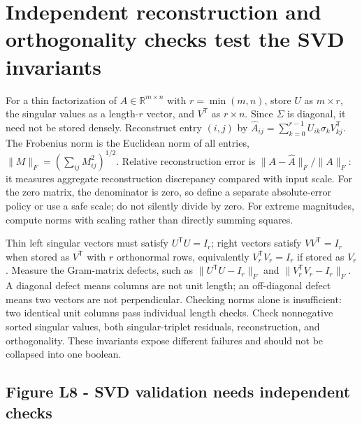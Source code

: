 \section{Independent reconstruction and orthogonality checks test the SVD invariants}\label{02-foundations-ii-ch038-independent-reconstruction-and-orthogonality-checks-test-the-svd-invariants}

\hypertarget{02-foundations-ii-ch038-independent-reconstruction-and-orthogonality-checks-test-the-svd-invariants}{}

For a thin factorization of \(A\in\mathbb R^{m\times n}\) with \(r=\min(m,n)\), store \(U\) as \(m\times r\), the singular values as a length-\(r\) vector, and \(V^\mathsf T\) as \(r\times n\). Since \(\Sigma\) is diagonal, it need not be stored densely. Reconstruct entry \((i,j)\) by \(\hat A_{ij}=\sum_{k=0}^{r-1}U_{ik}\sigma_kV^\mathsf T_{kj}\). The Frobenius norm is the Euclidean norm of all entries, \(\|M\|_F=(\sum_{ij}M_{ij}^2)^{1/2}\). Relative reconstruction error is \(\|A-\hat A\|_F/\|A\|_F\): it measures aggregate reconstruction discrepancy compared with input scale. For the zero matrix, the denominator is zero, so define a separate absolute-error policy or use a safe scale; do not silently divide by zero. For extreme magnitudes, compute norms with scaling rather than directly summing squares.

Thin left singular vectors must satisfy \(U^\mathsf TU=I_r\); right vectors satisfy \(VV^\mathsf T=I_r\) when stored as \(V^\mathsf T\) with \(r\) orthonormal rows, equivalently \(V_r^\mathsf TV_r=I_r\) if stored as \(V_r\). Measure the Gram-matrix defects, such as \(\|U^\mathsf TU-I_r\|_F\) and \(\|V_r^\mathsf TV_r-I_r\|_F\). A diagonal defect means columns are not unit length; an off-diagonal defect means two vectors are not perpendicular. Checking norms alone is insufficient: two identical unit columns pass individual length checks. Check nonnegative sorted singular values, both singular-triplet residuals, reconstruction, and orthogonality. These invariants expose different failures and should not be collapsed into one  boolean.

\subsection{Figure L8 - SVD validation needs independent checks}\label{02-foundations-ii-ch038-figure-l8---svd-validation-needs-independent-checks}

\hypertarget{02-foundations-ii-ch038-figure-l8---svd-validation-needs-independent-checks}{}

